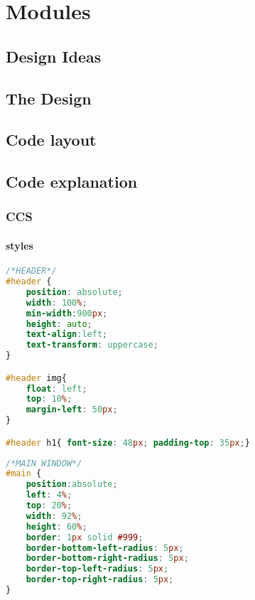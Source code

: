 \newpage
\chapter{Modules}
\section{Design Ideas}
\section{The Design}

\section{Code layout}

\section{Code explanation}

\subsection{CCS}
\subsubsection{styles}
\begin{lstlisting}[language=CSS] 
/*HEADER*/
#header {
	position: absolute;
	width: 100%;
	min-width:900px;
	height: auto;
	text-align:left;
	text-transform: uppercase;
}

#header img{
	float: left;
	top: 10%;
	margin-left: 50px;	
}

#header h1{ font-size: 48px; padding-top: 35px;}
\end{lstlisting}

\begin{lstlisting}[language=CSS] 
/*MAIN WINDOW*/
#main {
	position:absolute;
	left: 4%;
	top: 20%;
	width: 92%;
	height: 60%;
	border: 1px solid #999;
	border-bottom-left-radius: 5px;
	border-bottom-right-radius: 5px;
	border-top-left-radius: 5px;
	border-top-right-radius: 5px;
}
\end{lstlisting}

